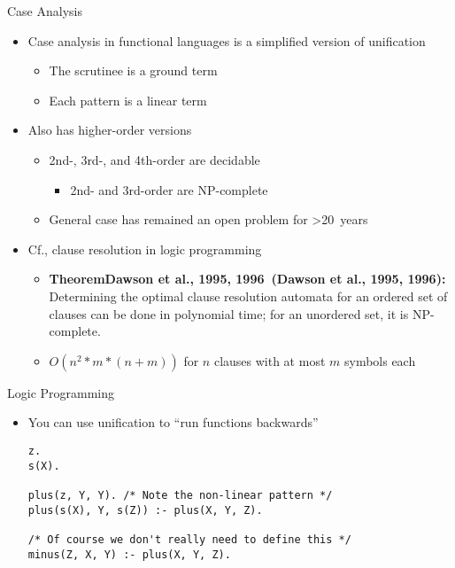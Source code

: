 \documentclass[pdf,fyma2]{prosper} %
\makeatletter
\newcommand{\thm}[1][]{%
    \def\thm@tmp{#1}%
    {\color{wine}%
    \textbf{Theorem\ifx\thm@tmp\@empty\relax\else\ (\thm@tmp)\fi:}\ }}
\makeatother
\begin{document}
\begin{slide}{Case Analysis}
	\begin{itemize}
	\item Case analysis in functional languages is a simplified version of unification
        \begin{itemize}
        \item The scrutinee is a ground term
        \item Each pattern is a linear term
        \end{itemize}
    \item Also has higher-order versions
        \begin{itemize}
        \item 2nd-, 3rd-, and 4th-order are decidable
            \begin{itemize}
            \item 2nd- and 3rd-order are NP-complete
            \end{itemize}
        \item General case has remained an open problem for >20~years
        \end{itemize}
	\vspace{1em}
    \item Cf., clause resolution in logic programming
        \begin{itemize}
        \item \thm[Dawson et al., 1995, 1996] Determining the optimal clause resolution automata for an ordered set of clauses can be done in polynomial time; for an unordered set, it is NP-complete.
        \item $O(n^2*m*(n+m))$ for $n$ clauses with at most $m$ symbols each
        \end{itemize}
	\end{itemize}
\end{slide}

\begin{slide}{Logic Programming}
	\vspace{1em}
	\begin{itemize}
	\item You can use unification to ``run functions backwards''
\begin{lstlisting}
z.
s(X).

plus(z, Y, Y). /* Note the non-linear pattern */
plus(s(X), Y, s(Z)) :- plus(X, Y, Z).

/* Of course we don't really need to define this */
minus(Z, X, Y) :- plus(X, Y, Z).
\end{lstlisting}
	\end{itemize}
\end{slide}
\end{document}

